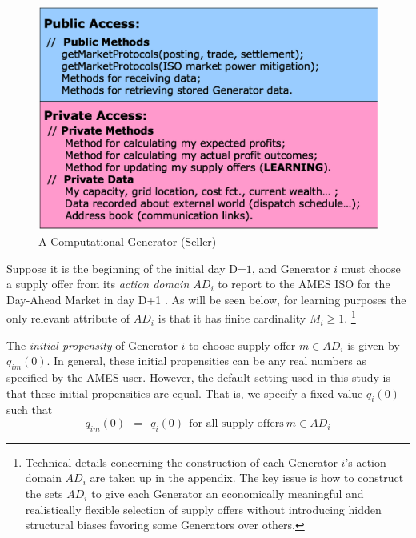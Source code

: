 \documentclass[12pt]{article}
\begin{document}
\begin{figure}
	\centering
		\includegraphics[totalheight = 9cm]{AMES.Gen.eps}
	\caption{A Computational Generator (Seller)}
	\label{fig:AMES.Gen}
\end{figure}  

    Suppose it is the beginning of the initial day D=$1$, and Generator $i$ must choose a supply offer from its 
\textit{action domain $AD_i$\/} to report to the AMES ISO for the Day-Ahead Market in day D+1 .  As will be seen below, for learning purposes the only relevant attribute of $AD_i$ is that it has finite cardinality $M_i \ge 1$.%
        \footnote{Technical details concerning the construction of each Generator $i$'s action domain $AD_i$ are taken up in the appendix. The key issue is how to construct the sets $AD_i$ to give each Generator an economically meaningful and realistically flexible selection of supply offers without introducing hidden structural biases favoring some Generators over others.}
      

    The \textit{initial propensity\/} of Generator $i$ to choose supply offer $m \in AD_i$ is
given by $q_{im}(0)$.  In general, these initial propensities can be 
any real numbers as specified by the AMES user.  However, the default setting used in this study is that these 
initial propensities are equal.  That is, we specify a fixed value $q_{i}(0)$ such that
                    \begin{equation}
     q_{im}(0) ~~ =  ~~q_{i}(0) ~~ \mbox{for all supply offers}~m \in AD_i
                  \label{initprop}
            \end{equation}
\end{document}
